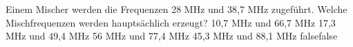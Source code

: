     {Einem Mischer werden die Frequenzen 28 MHz und 38,7 MHz zugeführt. Welche Mischfrequenzen werden hauptsächlich erzeugt?}
    {10,7 MHz und 66,7 MHz}
    {17,3 MHz und 49,4 MHz}
    {56 MHz und 77,4 MHz}
    {45,3 MHz und 88,1 MHz}
    {false}{false}